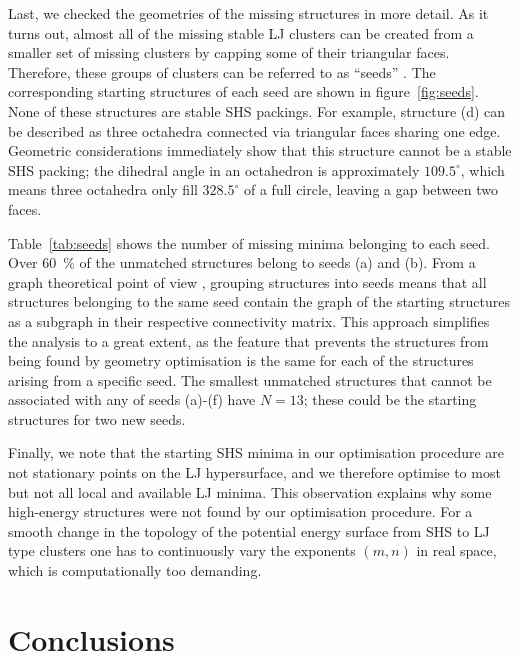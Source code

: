 Last, we checked the geometries of the missing structures in more detail.
As it turns out, almost all of the missing stable LJ clusters can be created
from a smaller set of missing clusters by capping some of their triangular
faces. Therefore, these groups of clusters can be referred to as ``seeds''
\autocite{Arkus_DerivingFiniteSphere_2011}. The corresponding starting structures of each seed
are shown in figure~\ref{fig:seeds}. 
None of these structures are stable \ac{SHS} packings. For
example, structure (d) can be described as three octahedra connected via
triangular faces sharing one edge. Geometric considerations \autocite{Arkus_DerivingFiniteSphere_2011,Hoy_Structurefinitesphere_2012} immediately show
that this structure cannot be a stable \ac{SHS} packing;
the dihedral angle in an octahedron is approximately $109.5^\circ$, which means three
octahedra only fill $328.5^\circ$ of a full circle, leaving a gap between two
faces. 


Table~\ref{tab:seeds} shows the number of missing minima belonging to each seed.
Over 60~\% of the unmatched structures belong to seeds (a) and (b).  
From a graph theoretical point of view \autocite{Arkus_Minimalenergyclusters_2009,Arkus_DerivingFiniteSphere_2011},
grouping structures into seeds means that all structures belonging to the same
seed contain the graph of the starting structures as a subgraph in their
respective connectivity matrix.  This approach simplifies the analysis to a
great extent, as the feature that prevents the structures from being found by
geometry optimisation is the same for each of the structures arising from a
specific seed.  
The smallest unmatched structures that cannot be associated with any of seeds (a)-(f) have $N=13$;
these could be the starting structures for two new seeds.


Finally, we note that the starting \ac{SHS} minima in our optimisation procedure are
not stationary points on the LJ hypersurface, and we therefore optimise to most
but not all local and available LJ minima. This observation explains why some high-energy
structures were not found by our optimisation procedure. For a smooth change in the topology of the potential energy surface
from \ac{SHS} to LJ type clusters one has to continuously vary the exponents $(m,n)$
in real space, which is computationally too demanding.

\section{Conclusions}

